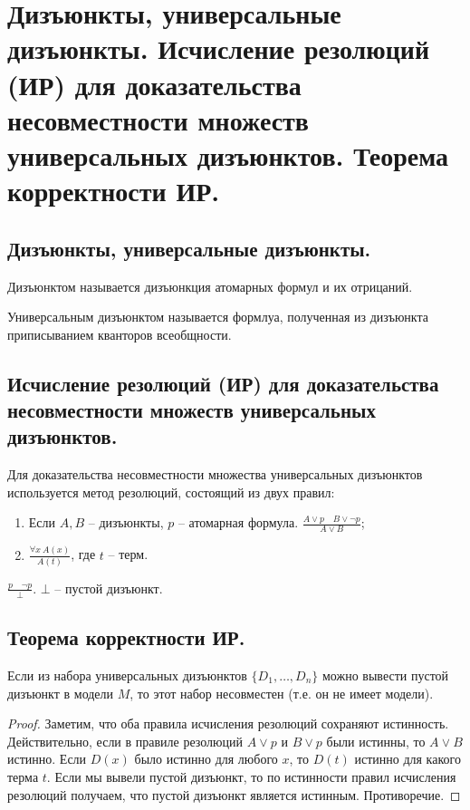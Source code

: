 \section{Дизъюнкты, универсальные дизъюнкты. Исчисление резолюций (ИР) для доказательства несовместности множеств универсальных дизъюнктов. Теорема корректности ИР.}

\subsection{Дизъюнкты, универсальные дизъюнкты.}

\begin{definition}
  Дизъюнктом называется дизъюнкция атомарных формул и их отрицаний.
\end{definition}

\begin{definition}
  Универсальным дизъюнктом называется формлуа, полученная из дизъюнкта приписыванием кванторов всеобщности.
\end{definition}

\subsection{Исчисление резолюций (ИР) для доказательства несовместности множеств универсальных дизъюнктов.}

Для доказательства несовместности множества универсальных дизъюнктов используется метод резолюций, состоящий из двух правил:
\begin{enumerate}
  \item Если $A,B$ -- дизъюнкты, $p$ -- атомарная формула. $\frac{A \vee p \quad B \vee \neg p}{A \vee B}$;
  \item $\frac{\forall x \> A(x)}{A(t)}$, где $t$ -- терм.
\end{enumerate}

\begin{definition}
  $\frac{p \quad \neg p}{\bot}$. $\bot$ -- пустой дизъюнкт.
\end{definition}

\subsection{Теорема корректности ИР.}

\begin{theorem}
  Если из набора универсальных дизъюнктов $\{D_1, \dots, D_n\}$ можно вывести пустой дизъюнкт в модели $M$, то этот набор несовместен (т.е. он не имеет модели).
  \begin{proof}
    Заметим, что оба правила исчисления резолюций сохраняют истинность. \newline
    Действительно, если в правиле резолюций $A \vee p$ и $B \vee p$ были истинны, то $A \vee B$ истинно. \newline
    Если $D(x)$ было истинно для любого $x$, то $D(t)$ истинно для какого терма $t$. \newline
    Если мы вывели пустой дизъюнкт, то по истинности правил исчисления резолюций получаем, что пустой дизъюнкт является истинным. Противоречие.
  \end{proof}
\end{theorem}